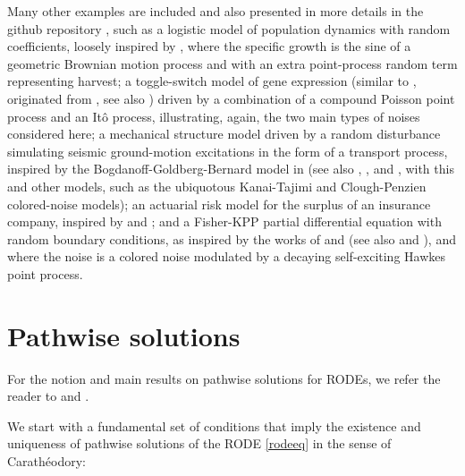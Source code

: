 \documentclass[reqno,12pt]{amsart}
\theoremstyle{plain} %
\theoremstyle{definition} %
\begin{document}
Many other examples are included and also presented in more details in the github repository \cite{RODEConvEM2023}, such as a logistic model of population dynamics with random coefficients, loosely inspired by \cite[Section 15.2]{HanKloeden2017}, where the specific growth is the sine of a geometric Brownian motion process and with an extra point-process random term representing harvest; a toggle-switch model of gene expression (similar to \cite[Section 7.8]{Asai2016}, originated from \cite{VerdCrombachJaeger2014}, see also \cite{StrasserTheisMarr2012}) driven by a combination of a compound Poisson point process and an It\^o process, illustrating, again, the two main types of noises considered here; a mechanical structure model driven by a random disturbance simulating seismic ground-motion excitations in the form of a transport process, inspired by the Bogdanoff-Goldberg-Bernard model in \cite{BogdanoffGoldbergBernard1961} (see also \cite[Chapter 18]{NeckelRupp2013}, \cite{HousnerJenning1964}, and \cite{Kanai1957}, with this and other models, such as the ubiquotous Kanai-Tajimi and Clough-Penzien colored-noise models); an actuarial risk model for the surplus of an insurance company, inspired by \cite{GerberShiu1998} and \cite{BrigoMercurio2006}; and a Fisher-KPP partial differential equation with random boundary conditions, as inspired by the works of \cite{SalakoShen2020} and \cite{FreidlinWentzell1992} (see also \cite{Fisher1937} and \cite{KPP1937}), and where the noise is a colored noise modulated by a decaying self-exciting Hawkes point process.

\section{Pathwise solutions}
\label{secpathwisesolution}

For the notion and main results on pathwise solutions for RODEs, we refer the reader to \cite[Section 2.1]{HanKloeden2017} and \cite[Section 3.3]{NeckelRupp2013}.

We start with a fundamental set of conditions that imply the existence and uniqueness of pathwise solutions of the RODE \eqref{rodeeq} in the sense of Carath\'eodory:
\end{document}
